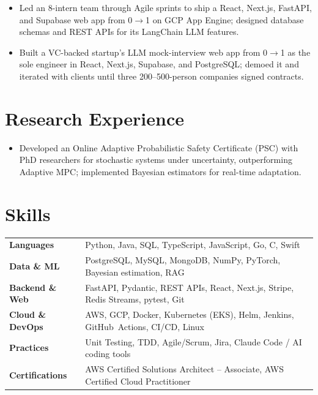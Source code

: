 \documentclass[11pt, letterpaper]{article}
\begin{document}
\vspace{1pt}
\begin{itemize}
  \item Led an 8-intern team through Agile sprints to ship a React, Next.js, FastAPI, and Supabase web app from 0$\to$1 on GCP App Engine; designed database schemas and REST APIs for its LangChain LLM features.
\end{itemize}

\vspace{1pt}
\begin{itemize}
  \item Built a VC-backed startup's LLM mock-interview web app from 0$\to$1 as the sole engineer in React, Next.js, Supabase, and PostgreSQL; demoed it and iterated with clients until three 200--500-person companies signed contracts.
\end{itemize}

\section{Research Experience}
\begin{itemize}
  \item Developed an Online Adaptive Probabilistic Safety Certificate (PSC) with PhD researchers for stochastic systems under uncertainty, outperforming Adaptive MPC; implemented Bayesian estimators for real-time adaptation.
\end{itemize}

\section{Skills}
\begin{tabularx}{\textwidth}{@{}l @{\hspace{7pt}} >{\raggedright\arraybackslash}X@{}}
  \textbf{Languages} & Python, Java, SQL, TypeScript, JavaScript, Go, C, Swift \\[1pt]
  \textbf{Data \& ML} & PostgreSQL, MySQL, MongoDB, NumPy, PyTorch, Bayesian estimation, RAG \\[1pt]
  \textbf{Backend \& Web} & FastAPI, Pydantic, REST APIs, React, Next.js, Stripe, Redis Streams, pytest, Git \\[1pt]
  \textbf{Cloud \& DevOps} & AWS, GCP, Docker, Kubernetes (EKS), Helm, Jenkins, GitHub~Actions, CI/CD, Linux \\[1pt]
  \textbf{Practices} & Unit Testing, TDD, Agile/Scrum, Jira, Claude Code / AI coding tools \\[1pt]
  \textbf{Certifications} & AWS Certified Solutions Architect -- Associate, AWS Certified Cloud Practitioner \\
\end{tabularx}
\end{document}
